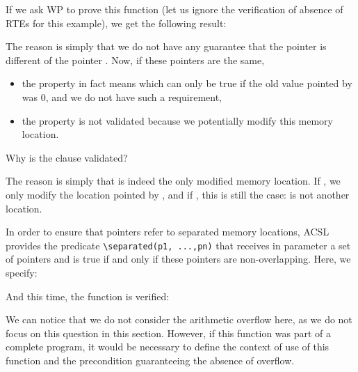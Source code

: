 


If we ask WP to prove this function (let us ignore the verification of absence
of RTEs for this example), we get the following result:





The reason is simply that we do not have any guarantee that the pointer
 is different of the pointer . Now, if these
pointers are the same,



\begin{itemize}
\item   the property  in fact
  means  which can only
  be true if the old value pointed by  was $0$, and we do
  not have such a requirement,
\item
  the property  is not validated
  because we potentially modify this memory location.
\end{itemize}


\begin{Question}
  Why is the  clause validated?

  The reason is simply that  is indeed the only modified memory
  location. If , we only modify the location pointed by
  , and if , this is still the case:
   is not another location.
\end{Question}


In order to ensure that pointers refer to separated memory locations,
ACSL provides the predicate
\texttt{\textbackslash{}separated(p1,\ ...,pn)} that receives in
parameter a set of pointers and is true if and only if these pointers are
non-overlapping. Here, we specify:






And this time, the function is verified:





We can notice that we do not consider the arithmetic overflow here, as
we do not focus on this question in this section. However, if this
function was part of a complete program, it would be necessary to define
the context of use of this function and the precondition guaranteeing
the absence of overflow.


